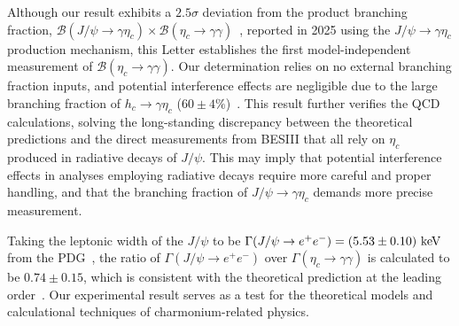 \documentclass[twocolumn,showpacs,aps,prl]{revtex4-2}
\begin{document}
Although our result exhibits a $2.5\sigma$ deviation from the product branching fraction, $\mathcal{B}(J/\psi \to \gamma \eta_c) \times \mathcal{B}(\eta_c \to \gamma \gamma)$~\cite{BESIII:2024rex}, reported in 2025 using the $J/\psi \to \gamma \eta_c$ production mechanism, this Letter establishes the first model-independent measurement of $\mathcal{B}(\eta_c \to \gamma \gamma)$. Our determination relies on no external branching fraction inputs, and potential interference effects are negligible due to the large branching fraction of $h_c \to \gamma \eta_c$ ($60 \pm 4\%$)~\cite{ParticleDataGroup:2024cfk}. This result further verifies the QCD calculations, solving the long-standing discrepancy between the theoretical predictions and the direct measurements from BESIII that all rely on $\eta_c$ produced in radiative decays of $J/\psi$. This may imply that potential interference effects in analyses employing radiative decays require more careful and proper handling, and that the branching fraction of $J/\psi \to \gamma \eta_c$ demands more precise measurement.

Taking the leptonic width of the $J/\psi$ to be $\Gamma(J/\psi \to e^+ e^-) = (5.53 \pm 0.10)~{\rm keV}$ from the PDG~\cite{ParticleDataGroup:2024cfk}, the ratio of $\Gamma(J/\psi \to e^+ e^-)$ over $\Gamma(\eta_c \to \gamma \gamma)$ is calculated to be $0.74 \pm 0.15$, which is consistent with the theoretical prediction at the leading order~\cite{Czarnecki:2001zc}. Our experimental result serves as a test for the theoretical models and calculational techniques of charmonium-related physics.




\end{document}
